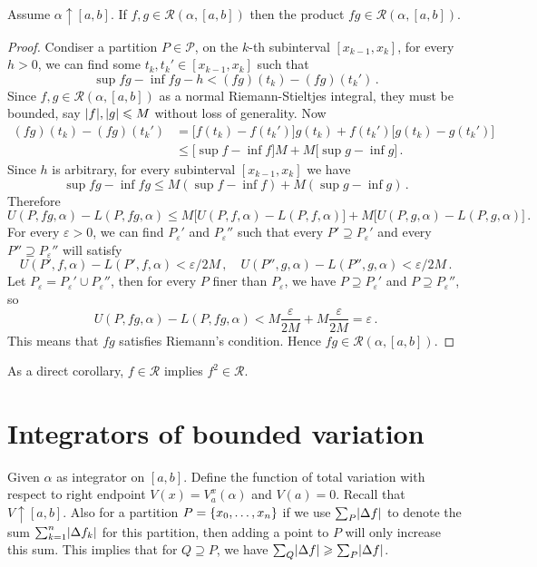 \documentclass{article}
\newcommand{\Riemann}{\mathcal R}
\newcommand{\Partition}{\mathcal P}
\DeclarePairedDelimiter\set{\lbrace}{\rbrace}
\DeclarePairedDelimiter\abs{\lvert}{\rvert}
\newcommand{\finer}{\supseteq}
\newcommand{\increasing}{\uparrow}
\begin{document}
\begin{theorem}
    Assume $ \alpha \increasing [a, b] $. If $ f, g \in \Riemann(\alpha, [a, b]) $ then the product $ f g \in \Riemann(\alpha, [a, b]) $.
\end{theorem}  


\begin{proof}
    Condiser a partition $ P \in \Partition $, on the $ k $-th subinterval $ [x_{k-1}, x_k] $, for every $ h > 0 $, we can find some $ t_k, t_k' \in [x_{k-1}, x_k] $ such that
    \[ 
        \sup fg - \inf fg - h < (fg)(t_k) - (fg)(t_k') \,.
    \]
    Since $ f, g \in \Riemann(\alpha, [a, b]) $ as a normal Riemann-Stieltjes integral, they must be bounded, say $ \abs{ f }, \abs{ g } \leqslant M $ without loss of generality. Now
    \begin{align*}
        (fg)(t_k) - (fg)(t_k') &= \big[ f(t_k) - f(t_k') \big] g(t_k) + f(t_k') \big[ g(t_k) - g(t_k') \big] \\
        &\leqslant \big[ \sup f - \inf f \big] M + M \big[ \sup g - \inf g \big] \,.
    \end{align*}
    Since $ h $ is arbitrary, for every subinterval $ [x_{k-1}, x_k] $ we have
    \[ 
        \sup fg - \inf fg \leqslant M (\sup f - \inf f) + M (\sup g - \inf g) \,.
    \]
    Therefore
    \[ 
        U(P, fg, \alpha) - L(P, fg, \alpha) \leqslant M \big[ U(P, f, \alpha) - L(P, f, \alpha) \big] + M \big[ U(P, g, \alpha) - L(P, g, \alpha) \big] \,.
    \]
    For every $ \varepsilon > 0 $, we can find $ P_\varepsilon' $ and $ P_\varepsilon'' $ such that every $ P' \finer P_\varepsilon' $ and every $ P'' \finer P_\varepsilon'' $ will satisfy
    \[ 
        U(P', f, \alpha) - L(P', f, \alpha) < \varepsilon/2M \,,\quad U(P'', g, \alpha) - L(P'', g, \alpha) < \varepsilon/2M \,.
    \]
    Let $ P_\varepsilon = P_\varepsilon' \cup P_\varepsilon'' $, then for every $ P $ finer than $ P_\varepsilon $, we have $ P \finer P_\varepsilon' $ and $ P \finer P_\varepsilon'' $, so
    \[ 
        U(P, fg, \alpha) - L(P, fg, \alpha) < M \dfrac{\varepsilon}{2M} + M \dfrac{\varepsilon}{2M} = \varepsilon \,.
    \]
    This means that $ fg $ satisfies Riemann's condition. Hence $ fg \in \Riemann(\alpha, [a, b]) $.
\end{proof}

As a direct corollary, $ f \in \Riemann $ implies $ f^2 \in \Riemann $.



\section{Integrators of bounded variation}
Given $ \alpha $ as integrator on $ [a, b] $. Define the function of total variation with respect to right endpoint $ V(x) = V_a^x (\alpha) $ and $ V(a) = 0 $. Recall that $ V \increasing [a, b] $. Also for a partition $ P = \set{x_0, \dots, x_n} $ if we use $ \sum_{P} \abs{ \Delta f } $ to denote the sum $ \sum_{k=1}^n \abs{ \Delta f_k } $ for this partition, then adding a point to $ P $ will only increase this sum. This implies that for $ Q \finer P $, we have $ \sum_{Q} \abs{ \Delta f } \geqslant \sum_{P} \abs{ \Delta f } $.
\end{document}
